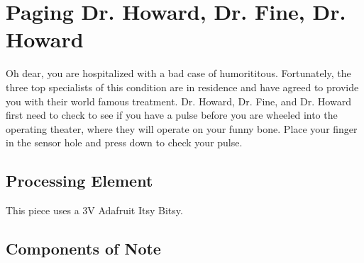 %
%
%
%
% 
%
%
%
%
%
% 
%

\section{Paging Dr. Howard, Dr. Fine, Dr. Howard}

Oh dear, you are hospitalized with a bad case of humorititous. Fortunately, the
three top specialists of this condition are in residence and have agreed to
provide you with their world famous treatment. Dr. Howard, Dr. Fine, and Dr.
Howard first need to check to see if you have a pulse before you are wheeled
into the operating theater, where they will operate on your funny bone. Place
your finger in the sensor hole and press down to check your pulse.

\subsection*{Processing Element}

This piece uses a 3V Adafruit Itsy Bitsy.

\subsection*{Components of Note}

